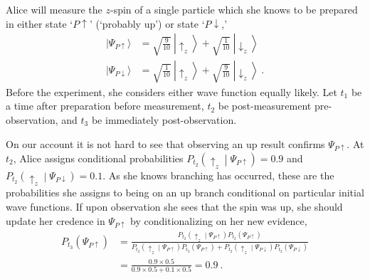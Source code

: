\documentclass[12pt,onecolumn,secnumarabic,amsmath,amssymb,balancelastpage,nofootinbib]{article}
\begin{document}
\begin{description}[font=\normalfont\scshape]
\item[What Wave Function?] Alice will measure the $z$-spin of a single particle which she knows to be prepared in either state `$P\!\uparrow$' (`probably up') or state `$P\!\downarrow$,'
\begin{align}
|\Psi_{P\uparrow}\rangle &= \sqrt{\frac{9}{10}}\:\left|\uparrow_z\right\rangle+\sqrt{\frac{1}{10}}\:\left|\downarrow_z\right\rangle
\nonumber
\\
|\Psi_{P\downarrow}\rangle &= \sqrt{\frac{1}{10}}\:\left|\uparrow_z\right\rangle+\sqrt{\frac{9}{10}}\:\left|\downarrow_z\right\rangle\ .
\label{whatwf}
\end{align}
Before the experiment, she considers either wave function equally likely.  Let $t_1$ be a time after preparation before measurement, $t_2$ be post-measurement pre-observation, and $t_3$ be immediately post-observation.
\end{description}
On our account it is not hard to see that observing an up result confirms $\Psi_{P\uparrow}$.  At $t_2$, Alice assigns conditional probabilities $P_{t_2}\left(\uparrow_z\middle|\Psi_{P\uparrow}\right)=0.9$ and $P_{t_2}\left(\uparrow_z\middle|\Psi_{P\downarrow}\right)=0.1$.  As she knows branching has occurred, these are the probabilities she assigns to being on an up branch conditional on particular initial wave functions.  If upon observation she sees that the spin was up, she should update her credence in $\Psi_{P\uparrow}$ by conditionalizing on her new evidence,
\begin{align}
P_{t_3}\left(\Psi_{P\uparrow}\right)&=\frac{P_{t_2}\left(\uparrow_z\middle|\Psi_{P\uparrow}\right)P_{t_2}\left(\Psi_{P\uparrow}\right)}{P_{t_2}\left(\uparrow_z\middle|\Psi_{P\uparrow}\right)P_{t_2}\left(\Psi_{P\uparrow}\right)+P_{t_2}\left(\uparrow_z\middle|\Psi_{P\downarrow}\right)P_{t_2}\left(\Psi_{P\downarrow}\right)}
\nonumber
\\
&=\frac{0.9 \times 0.5}{0.9 \times 0.5+0.1 \times 0.5}=0.9\ .
\label{updating}
\end{align}
\end{document}
